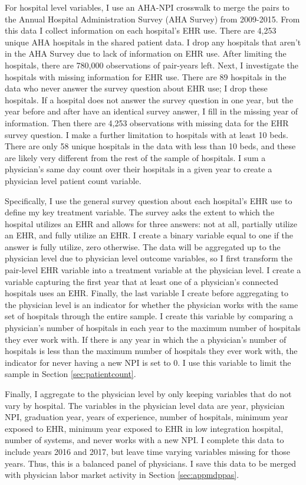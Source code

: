 \documentclass[12pt]{article}
\begin{document}
For hospital level variables, I use an AHA-NPI crosswalk to merge the pairs to the Annual Hospital Administration Survey (AHA Survey) from 2009-2015. From this data I collect information on each hospital's EHR use. There are 4,253 unique AHA hospitals in the shared patient data. I drop any hospitals that aren't in the AHA Survey due to lack of information on EHR use. After limiting the hospitals, there are 780,000 observations of pair-years left. Next, I investigate the hospitals with missing information for EHR use. There are 89 hospitals in the data who never answer the survey question about EHR use; I drop these hospitals. If a hospital does not answer the survey question in one year, but the year before and after have an identical survey answer, I fill in the missing year of information. Then there are 4,253 observations with missing data for the EHR survey question. I make a further limitation to hospitals with at least 10 beds. There are only 58 unique hospitals in the data with less than 10 beds, and these are likely very different from the rest of the sample of hospitals. I sum a physician's same day count over their hospitals in a given year to create a physician level patient count variable. 

Specifically, I use the general survey question about each hospital's EHR use to define my key treatment variable. The survey asks the extent to which the hospital utilizes an EHR and allows for three answers: not at all, partially utilize an EHR, and fully utilize an EHR. I create a binary variable equal to one if the answer is fully utilize, zero otherwise. The data will be aggregated up to the physician level due to physician level outcome variables, so I first transform the pair-level EHR variable into a treatment variable at the physician level. I create a variable capturing the first year that at least one of a physician's connected hospitals uses an EHR. Finally, the last variable I create before aggregating to the physician level is an indicator for whether the physician works with the same set of hospitals through the entire sample. I create this variable by comparing a physician's number of hospitals in each year to the maximum number of hospitals they ever work with. If there is any year in which the a physician's number of hospitals is less than the maximum number of hospitals they ever work with, the indicator for never having a new NPI is set to 0. I use this variable to limit the sample in Section \ref{sec:patientcount}. 

Finally, I aggregate to the physician level by only keeping variables that do not vary by hospital. The variables in the physician level data are year, physician NPI, graduation year, years of experience, number of hospitals, minimum year exposed to EHR, minimum year exposed to EHR in low integration hospital, number of systems, and never works with a new NPI. I complete this data to include years 2016 and 2017, but leave time varying variables missing for those years. Thus, this is a balanced panel of physicians. I save this data to be merged with physician labor market activity in Section \ref{sec:appmdppas}.
\end{document}

